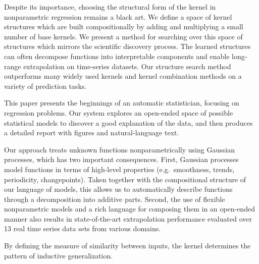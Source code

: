 Despite its importance, choosing the structural form of the kernel in nonparametric regression remains a black art.
We define a space of kernel structures which are built compositionally by adding and multiplying a small number of base kernels.
We present a method for searching over this space of structures which mirrors the scientific discovery process.
The learned structures can often decompose functions into interpretable components and enable long-range extrapolation on time-series datasets.
Our structure search method outperforms many widely used kernels and kernel combination methods on a variety of prediction tasks.



This paper presents the beginnings of an automatic statistician, focusing on regression problems.
Our system explores an open-ended space of possible statistical models to discover a good explanation of the data, and then produces a detailed report with figures and natural-language text.

Our approach treats unknown functions nonparametrically using Gaussian processes, which has two important consequences.
First, Gaussian processes model functions in terms of high-level properties (e.g.\ smoothness, trends, periodicity,
changepoints).
Taken together with the compositional structure of our language of models, this allows us to automatically describe functions through a decomposition into additive parts.
Second, the use of flexible nonparametric models and a rich
language for composing them in an open-ended manner also results
in state-of-the-art extrapolation performance evaluated over 13 real time
series data sets from various domains.





By defining the measure of similarity between inputs, the kernel determines the pattern of inductive generalization.

